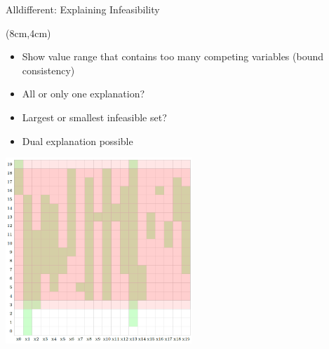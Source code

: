 \documentclass[dvipsnames,aspectratio=169]{beamer}
\begin{document}
\begin{frame}{Alldifferent: Explaining Infeasibility}
\begin{textblock*}{7cm}(8cm,4cm)
\begin{itemize}
    \item Show value range that contains too many competing variables (bound consistency)
    \item All or only one explanation?
    \item Largest or smallest infeasible set?
    \item Dual explanation possible
\end{itemize}
\end{textblock*}
\includegraphics[width=7cm]{images/alldifferentexplanation.PNG}    
\end{frame}
\end{document}
